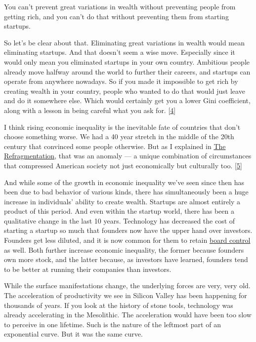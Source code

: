 You can't prevent great variations in wealth without preventing people
from getting rich, and you can't do that without preventing them from
starting startups.

So let's be clear about that. Eliminating great variations in wealth
would mean eliminating startups. And that doesn't seem a wise move.
Especially since it would only mean you eliminated startups in your own
country. Ambitious people already move halfway around the world to
further their careers, and startups can operate from anywhere nowadays.
So if you made it impossible to get rich by creating wealth in your
country, people who wanted to do that would just leave and do it
somewhere else. Which would certainly get you a lower Gini coefficient,
along with a lesson in being careful what you ask for.
{[}\hyperref[f4n]{4}{]}

I think rising economic inequality is the inevitable fate of countries
that don't choose something worse. We had a 40 year stretch in the
middle of the 20th century that convinced some people otherwise. But as
I explained in \href{re.html}{The Refragmentation}, that was an anomaly
--- a unique combination of circumstances that compressed American
society not just economically but culturally too.
{[}\hyperref[f5n]{5}{]}

And while some of the growth in economic inequality we've seen since
then has been due to bad behavior of various kinds, there has
simultaneously been a huge increase in individuals' ability to create
wealth. Startups are almost entirely a product of this period. And even
within the startup world, there has been a qualitative change in the
last 10 years. Technology has decreased the cost of starting a startup
so much that founders now have the upper hand over investors. Founders
get less diluted, and it is now common for them to retain
\href{control.html}{board control} as well. Both further increase
economic inequality, the former because founders own more stock, and the
latter because, as investors have learned, founders tend to be better at
running their companies than investors.

While the surface manifestations change, the underlying forces are very,
very old. The acceleration of productivity we see in Silicon Valley has
been happening for thousands of years. If you look at the history of
stone tools, technology was already accelerating in the Mesolithic. The
acceleration would have been too slow to perceive in one lifetime. Such
is the nature of the leftmost part of an exponential curve. But it was
the same curve.

